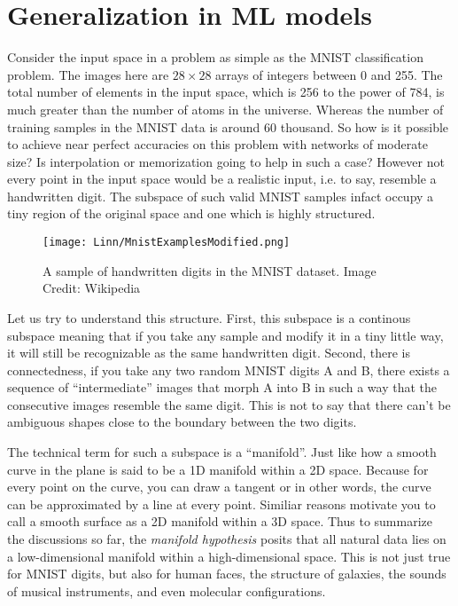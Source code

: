 \documentclass{../template/texnote}
\begin{document}
\section{Generalization in ML models}
Consider the input space in a problem as simple as the MNIST classification problem. The images here are $28 \times 28$ arrays of integers between 0 and 255.
The total number of elements in the input space, which is 256 to the power of 784, is much greater than the number of atoms in the universe.
Whereas the number of training samples in the MNIST data is around 60 thousand.
So how is it possible to achieve near perfect accuracies on this problem with networks of moderate size?
Is interpolation or memorization going to help in such a case?
However not every point in the input space would be a realistic input, i.e. to say, resemble a handwritten digit.
The subspace of such valid MNIST samples infact occupy a tiny region of the original space and one which is highly structured.
    \begin{figure}
    \begin{center}
        \texttt{[image: Linn/MnistExamplesModified.png]}
    \end{center}
    \caption{A sample of handwritten digits in the MNIST dataset. Image Credit: Wikipedia}
    \label{fig:mnist}
    \end{figure}
    

Let us try to understand this structure.
First, this subspace is a continous subspace meaning that if you take any sample and modify it in a tiny little way, it will still be recognizable as the same handwritten digit.
Second, there is connectedness, if you take any two random MNIST digits A and B, there exists a sequence of ``intermediate'' images that morph A into B in such a way that the consecutive images resemble the same digit.
This is not to say that there can't be ambiguous shapes close to the boundary between the two digits.

The technical term for such a subspace is a ``manifold''.
Just like how a smooth curve in the plane is said to be a 1D manifold within a 2D space. Because for every point on the curve, you can draw a tangent or in other words, the curve can be approximated by a line at every point.
Similiar reasons motivate you to call a smooth surface as a 2D manifold within a 3D space.
Thus to summarize the discussions so far, the \emph{manifold hypothesis} posits that all natural data lies on a low-dimensional manifold within a high-dimensional space.
This is not just true for MNIST digits, but also for human faces, the structure of galaxies, the sounds of musical instruments, and even molecular configurations.
\end{document}
